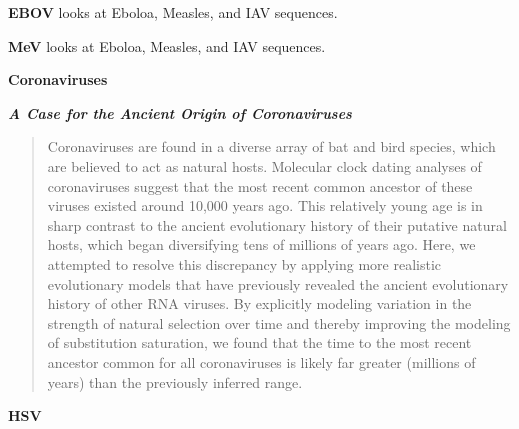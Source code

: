 \textbf{EBOV}
\citep{wertheim2011purifying} looks at Eboloa, Measles, and IAV sequences. 

\textbf{MeV}
\citep{wertheim2011purifying} looks at Eboloa, Measles, and IAV sequences. 

\textbf{Coronaviruses}

\textbf{\textit{A Case for the Ancient Origin of Coronaviruses}}\citep{wertheim2013case}
\begin{quote}
Coronaviruses are found in a diverse array of bat and bird species, which are believed to act as natural hosts. Molecular clock dating analyses of coronaviruses suggest that the most recent common ancestor of these viruses existed around 10,000 years ago. This relatively young age is in sharp contrast to the ancient evolutionary history of their putative natural hosts, which began diversifying tens of millions of years ago. Here, we attempted to resolve this discrepancy by applying more realistic evolutionary models that have previously revealed the ancient evolutionary history of other RNA viruses. By explicitly modeling variation in the strength of natural selection over time and thereby improving the modeling of substitution saturation, we found that the time to the most recent ancestor common for all coronaviruses is likely far greater (millions of years) than the previously inferred range.
\end{quote}

\textbf{HSV}

